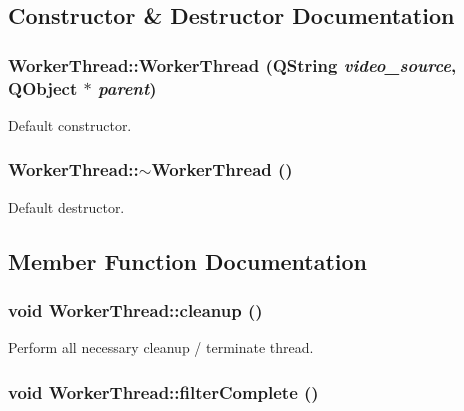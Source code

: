 \subsection{Constructor \& Destructor Documentation}
\hypertarget{classWorkerThread_c4ca6480ac57511724082cd4961038e4}{
\subsubsection[{WorkerThread}]{\setlength{\rightskip}{0pt plus 5cm}WorkerThread::WorkerThread (QString {\em video\_\-source}, \/  QObject $\ast$ {\em parent})}}
\label{classWorkerThread_c4ca6480ac57511724082cd4961038e4}


Default constructor. \hypertarget{classWorkerThread_5aa554e7d73f0f185a850ca0ef145d6d}{
\subsubsection[{$\sim$WorkerThread}]{\setlength{\rightskip}{0pt plus 5cm}WorkerThread::$\sim$WorkerThread ()}}
\label{classWorkerThread_5aa554e7d73f0f185a850ca0ef145d6d}


Default destructor. 

\subsection{Member Function Documentation}
\hypertarget{classWorkerThread_035f43bc756f6f220555fb501fad1776}{
\subsubsection[{cleanup}]{\setlength{\rightskip}{0pt plus 5cm}void WorkerThread::cleanup ()}}
\label{classWorkerThread_035f43bc756f6f220555fb501fad1776}


Perform all necessary cleanup / terminate thread. \hypertarget{classWorkerThread_ea7496b585a29398a3c5a490fb3bf9c6}{
\subsubsection[{filterComplete}]{\setlength{\rightskip}{0pt plus 5cm}void WorkerThread::filterComplete ()}}
\label{classWorkerThread_ea7496b585a29398a3c5a490fb3bf9c6}


